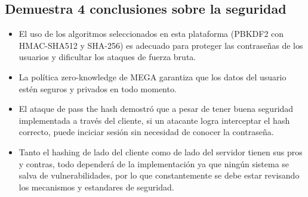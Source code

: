 \documentclass[letter,12pt]{article}
\begin{document}
\subsection{Demuestra 4 conclusiones sobre la seguridad}

\begin{itemize}
    \item El uso de los algoritmos seleccionados en esta plataforma (PBKDF2 con HMAC-SHA512 y SHA-256) es adecuado para proteger las contraseñas de los usuarios y dificultar los ataques de fuerza bruta.
    \item La política zero-knowledge de MEGA garantiza que los datos del usuario estén seguros y privados en todo momento.
    \item El ataque de pass the hash demostró que a pesar de tener buena seguridad implementada a través del cliente, si un atacante logra interceptar el hash correcto, puede inciciar sesión sin necesidad de conocer la contraseña.
    \item Tanto el hashing de lado del cliente como de lado del servidor tienen sus pros y contras, todo dependerá de la implementación ya que ningún sistema se salva de vulnerabilidades, por lo que constantemente se debe estar revisando los mecanismos y estandares de seguridad.
\end{itemize}

\end{document}
